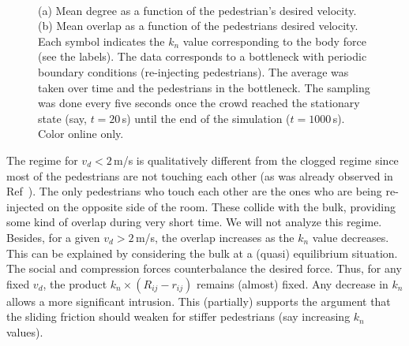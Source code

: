 \documentclass[preprint,12pt]{elsarticle}
\begin{document}
\begin{figure}[!htbp]
\centering
{}\ 
\\
\caption[width=0.47\columnwidth]{(a) Mean degree as a function of the
pedestrian’s desired velocity. (b) Mean overlap as a function of the
pedestrians desired velocity. Each symbol indicates the $k_n$ value
corresponding to the body force (see the labels). The data corresponds to a
bottleneck with periodic boundary conditions (re-injecting pedestrians). The
average was taken over time and the pedestrians in the bottleneck. The sampling
was done every five seconds once the crowd reached the stationary state (say,
$t=20\,$s) until the end of the simulation ($t=1000\,$s). Color online only.}
\label{degree_overlap_vd}
\end{figure}

The regime for $v_d<2\,$m/s is qualitatively different from the clogged regime
since most of the  pedestrians are not touching each other (as was already
observed in Ref~\cite{dorso_2005,dorso_2011}). The only pedestrians who touch
each  other are the ones who are being re-injected on the opposite side of the
room. These collide with the bulk, providing some kind of overlap during very
short time. We will not analyze this regime.\\

Besides, for a given $v_d>2\,$m/s, the overlap increases as the $k_n$ value
decreases.  This can be explained by considering the bulk at a (quasi)
equilibrium situation.  The social and compression forces counterbalance the
desired force. Thus, for any fixed $v_d$, the product $k_n \times
(R_{ij}-r_{ij})$ remains (almost) fixed. Any decrease in $k_n$ allows a more
significant intrusion. This (partially) supports the argument that the sliding
friction should weaken for stiffer pedestrians (say increasing $k_n$ values).\\
\end{document}
